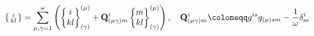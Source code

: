 \documentclass[preview]{standalone}
\begin{document}
\begin{align*}
\special{dvisvgm:raw <g id='unique000'>}\left\{\begin{smallmatrix}i\\kl\end{smallmatrix}\right\} = \sum_{\mu,\gamma=1}^\omega \left(\begin{Bmatrix}i\\kl\end{Bmatrix}_{(\gamma)}^{(\mu)} + \mathbf{Q}_{(\mu\gamma)m}^i \begin{Bmatrix}m\\kl\end{Bmatrix}_{(\gamma)}^{(\mu)}\right),\quad \mathbf{Q}_{(\mu\gamma)m}^i \coloneqq g^{is}g_{(\mu)sm} - \frac{1}{\omega}\delta_m^i\special{dvisvgm:raw </g>}
\end{align*}
\end{document}
